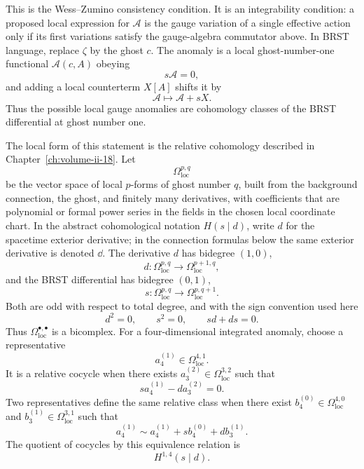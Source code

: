 This is the Wess--Zumino consistency condition.  It is an integrability
condition: a proposed local expression for \(\mathcal A\) is the gauge
variation of a single effective action only if its first variations satisfy
the gauge-algebra commutator above.  In BRST language, replace \(\zeta\) by
the ghost \(c\).  The anomaly is a local ghost-number-one functional
\(\mathcal A(c,A)\) obeying
\begin{equation}
  s\mathcal A=0,
  \label{eq:brst-anomaly-cocycle}
\end{equation}
and adding a local counterterm \(X[A]\) shifts it by
\[
  \mathcal A\longmapsto \mathcal A+sX .
\]
Thus the possible local gauge anomalies are cohomology classes of the BRST
differential at ghost number one.

The local form of this statement is the relative cohomology described in
Chapter~\ref{ch:volume-ii-18}.  Let
\[
  \Omega_{\mathrm{loc}}^{p,q}
\]
be the vector space of local \(p\)-forms of ghost number \(q\), built from the
background connection, the ghost, and finitely many derivatives, with
coefficients that are polynomial or formal power series in the fields in the
chosen local coordinate chart.  In the abstract cohomological notation
\(H(s\mid d)\), write \(d\) for the spacetime exterior derivative; in the
connection formulas below the same exterior derivative is denoted \(\dd\).
The derivative \(d\) has bidegree \((1,0)\),
\[
  d:\Omega_{\mathrm{loc}}^{p,q}\longrightarrow
  \Omega_{\mathrm{loc}}^{p+1,q},
\]
and the BRST differential has bidegree \((0,1)\),
\[
  s:\Omega_{\mathrm{loc}}^{p,q}\longrightarrow
  \Omega_{\mathrm{loc}}^{p,q+1}.
\]
Both are odd with respect to total degree, and with the sign convention used
here
\begin{equation}
  d^2=0,\qquad s^2=0,\qquad sd+ds=0 .
  \label{eq:descent-bicomplex-differentials}
\end{equation}
Thus \(\Omega_{\mathrm{loc}}^{\bullet,\bullet}\) is a bicomplex.  For a
four-dimensional integrated anomaly, choose a representative
\[
  a_4^{(1)}\in\Omega_{\mathrm{loc}}^{4,1}.
\]
It is a relative cocycle when there exists
\(a_3^{(2)}\in\Omega_{\mathrm{loc}}^{3,2}\) such that
\begin{equation}
  s a_4^{(1)}-d a_3^{(2)}=0 .
  \label{eq:relative-anomaly-cocycle}
\end{equation}
Two representatives define the same relative class when there exist
\(b_4^{(0)}\in\Omega_{\mathrm{loc}}^{4,0}\) and
\(b_3^{(1)}\in\Omega_{\mathrm{loc}}^{3,1}\) such that
\begin{equation}
  a_4^{(1)}
  \sim
  a_4^{(1)}+s b_4^{(0)}+d b_3^{(1)} .
  \label{eq:relative-anomaly-coboundary}
\end{equation}
The quotient of cocycles by this equivalence relation is
\[
  H^{1,4}(s\mid d).
\]

